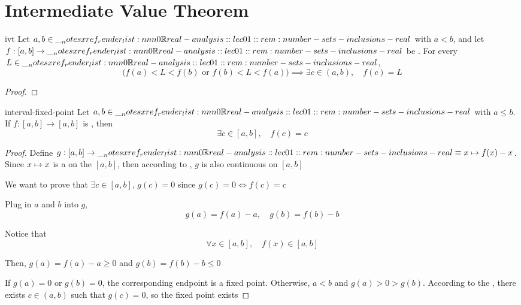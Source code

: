 \documentclass[12pt]{article}
\begin{document}
\section{Intermediate Value Theorem} 

\begin{thm}{ivt}
  Let \(a,b\in\RR\) with \(a<b\), and let \(f:[a,b]\to\RR\) be
  . For every \(L\in\RR\),
  \[
    \bigl(f(a)<L<f(b)\text{ or }f(b)<L<f(a)\bigr)
    \implies\exists c\in(a,b),\quad f(c)=L
  \]
\end{thm}

\begin{proof}
  \todo
\end{proof}

\begin{cor}{interval-fixed-point}
  Let \(a,b\in\RR\) with \(a\leq b\). If \(f:[a,b]\to[a,b]\) is
  , then
  \[
    \exists c\in[a,b],\quad f(c)=c
  \]
\end{cor}

\begin{proof}
  Define $g:[a,b]\to\RR\defeq x\map f(x)-x$. Since $x \mapsto x$ is a
   on the
   $[a,b]$, then according
  to ,
  $g$ is also continuous on $[a,b]$

  We want to prove that $\exists c\in[a,b],\,g(c)=0$ since
  $g(c)=0\iff f(c)=c$

  Plug in $a$ and $b$ into $g$,
  \[g(a) = f(a) - a, \quad g(b) = f(b) - b\]

  Notice that
  \[\forall x\in[a,b],\quad f(x)\in[a,b]\]

  Then, $g(a)=f(a)-a\geq0$ and $g(b)=f(b)-b\leq0$

  If $g(a)=0$ or $g(b)=0$, the corresponding endpoint is a fixed point.
  Otherwise, $a<b$ and $g(a)>0>g(b)$. According to the
  , there exists $c\in(a,b)$
  such that $g(c)=0$, so the fixed point exists
\end{proof}
\end{document}
